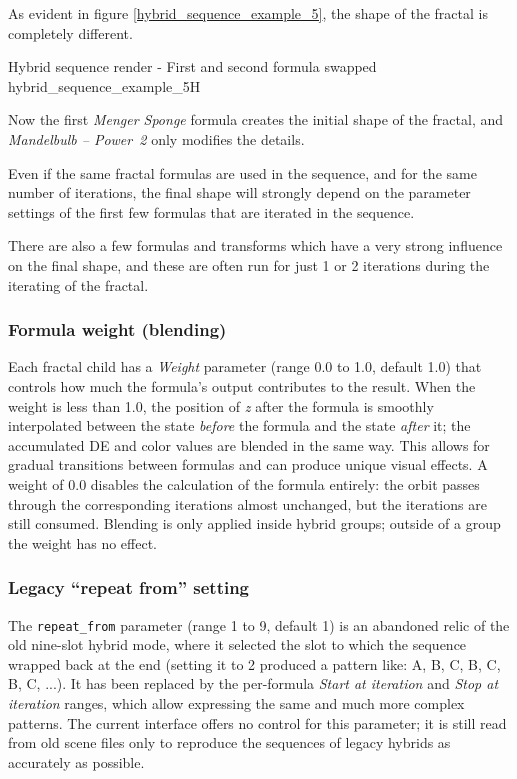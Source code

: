 As evident in figure \ref{hybrid_sequence_example_5}, the shape of the fractal is completely different.

{Hybrid sequence render - First and second formula swapped}
{hybrid_sequence_example_5}{H}

Now the first \emph{Menger Sponge} formula creates the initial shape of the fractal, and \emph{Mandelbulb -- Power~2} only modifies the details.

Even if the same fractal formulas are used in the sequence, and for the same number of iterations, the final shape will strongly depend on the parameter settings of the first few formulas that are iterated in the sequence.

There are also a few formulas and transforms which have a very strong influence on the final shape, and these are often run for just 1 or 2 iterations during the iterating of the fractal.

\subsubsection{Formula weight (blending)}\label{hybrid-formula-weight}

Each fractal child has a \emph{Weight} parameter (range 0.0 to 1.0, default 1.0) that controls how much the formula's output contributes to the result.
When the weight is less than 1.0, the position of \emph{z} after the formula is smoothly interpolated between the state \emph{before} the formula and the state \emph{after} it; the accumulated DE and color values are blended in the same way.
This allows for gradual transitions between formulas and can produce unique visual effects.
A weight of 0.0 disables the calculation of the formula entirely: the orbit passes through the corresponding iterations almost unchanged, but the iterations are still consumed.
Blending is only applied inside hybrid groups; outside of a group the weight has no effect.

\subsubsection{Legacy ``repeat from'' setting}

The \texttt{repeat\_from} parameter (range 1 to 9, default 1) is an abandoned relic of the old
nine-slot hybrid mode, where it selected the slot to which the sequence wrapped back at the
end (setting it to 2 produced a pattern like: A, B, C, B, C, B, C, ...). It has been replaced
by the per-formula \emph{Start at iteration} and \emph{Stop at iteration} ranges, which allow
expressing the same and much more complex patterns. The current interface offers no control
for this parameter; it is still read from old scene files only to reproduce the sequences of
legacy hybrids as accurately as possible.

